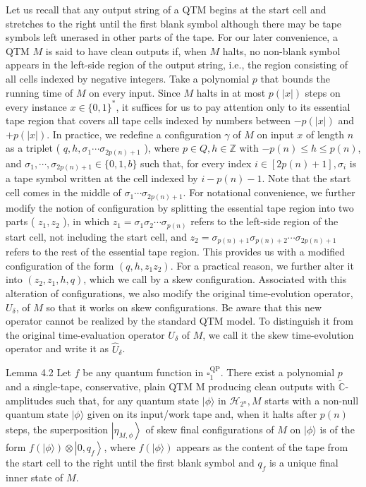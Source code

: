 \documentclass[10pt]{article}
\begin{document}
Let us recall that any output string of a QTM begins at the start cell and stretches to the right until the first blank symbol although there may be tape symbols left unerased in other parts of the tape. For our later convenience, a QTM $M$ is said to have clean outputs if, when $M$ halts, no non-blank symbol appears in the left-side region of the output string, i.e., the region consisting of all cells indexed by negative integers. Take a polynomial $p$ that bounds the running time of $M$ on every input. Since $M$ halts in at most $p(|x|)$ steps on every instance $x \in\{0,1\}^{*}$, it suffices for us to pay attention only to its essential tape region that covers all tape cells indexed by numbers between $-p(|x|)$ and $+p(|x|)$. In practice, we redefine a configuration $\gamma$ of $M$ on input $x$ of length $n$ as a triplet ( $q, h, \sigma_{1} \cdots \sigma_{2 p(n)+1}$ ), where $p \in Q, h \in \mathbb{Z}$ with $-p(n) \leq h \leq p(n)$, and $\sigma_{1}, \cdots, \sigma_{2 p(n)+1} \in\{0,1, b\}$ such that, for every index $i \in[2 p(n)+1], \sigma_{i}$ is a tape symbol written at the cell indexed by $i-p(n)-1$. Note that the start cell comes in the middle of $\sigma_{1} \cdots \sigma_{2 p(n)+1}$. For notational convenience, we further modify the notion of configuration by splitting the essential tape region into two parts ( $z_{1}, z_{2}$ ), in which $z_{1}=\sigma_{1} \sigma_{2} \cdots \sigma_{p(n)}$ refers to the left-side region of the start cell, not including the start cell, and $z_{2}=\sigma_{p(n)+1} \sigma_{p(n)+2} \cdots \sigma_{2 p(n)+1}$ refers to the rest of the essential tape region. This provides us with a modified configuration of the form $\left(q, h, z_{1} z_{2}\right)$. For a practical reason, we further alter it into $\left(z_{2}, z_{1}, h, q\right)$, which we call by a skew configuration. Associated with this alteration of configurations, we also modify the original time-evolution operator, $U_{\delta}$, of $M$ so that it works on skew configurations. Be aware that this new operator cannot be realized by the standard QTM model. To distinguish it from the original time-evaluation operator $U_{\delta}$ of $M$, we call it the skew time-evolution operator and write it as $\widehat{U}_{\delta}$.

Lemma 4.2 Let $f$ be any quantum function in $\square_{1}^{\mathrm{QP}}$. There exist a polynomial $p$ and a single-tape, conservative, plain QTM M producing clean outputs with $\tilde{\mathbb{C}}$-amplitudes such that, for any quantum state $|\phi\rangle$ in $\mathcal{H}_{2^{n}}, M$ starts with a non-null quantum state $|\phi\rangle$ given on its input/work tape and, when it halts after $p(n)$ steps, the superposition $\left|\eta_{M, \phi}\right\rangle$ of skew final configurations of $M$ on $|\phi\rangle$ is of the form $f(|\phi\rangle) \otimes\left|0, q_{f}\right\rangle$, where $f(|\phi\rangle)$ appears as the content of the tape from the start cell to the right until the first blank symbol and $q_{f}$ is a unique final inner state of $M$.
\end{document}
